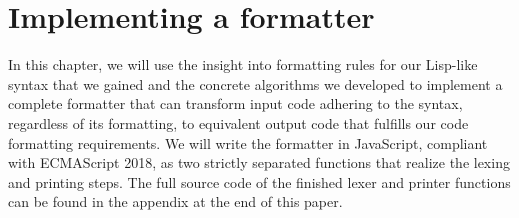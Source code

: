 \chapter{Implementing a formatter}\label{chap:implementation}
In this chapter, we will use the insight into formatting rules for our Lisp-like syntax that we gained
and the concrete algorithms we developed to implement a complete formatter that can transform
input code adhering to the syntax, regardless of its formatting, to
equivalent output code that fulfills our code formatting requirements.
We will write the formatter in JavaScript, compliant with ECMAScript 2018,
as two strictly separated functions that realize the lexing and printing steps.
The full source code of the finished lexer and printer functions
can be found in the appendix at the end of this paper.




